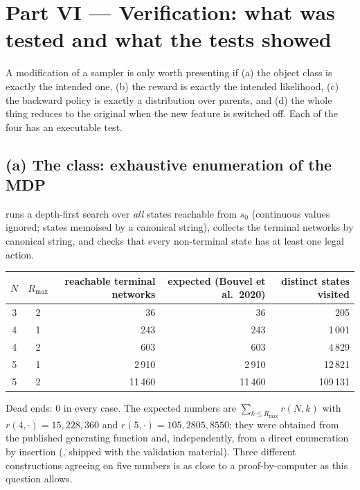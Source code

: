 \section{Part VI --- Verification: what was tested and what the tests showed}

\begin{keybox}
A modification of a sampler is only worth presenting if (a) the object class is exactly the intended one, (b) the reward is exactly the intended likelihood, (c) the backward policy is exactly a distribution over parents, and (d) the whole thing reduces to the original when the new feature is switched off. Each of the four has an executable test.
\end{keybox}

\subsection{(a) The class: exhaustive enumeration of the MDP}
 runs a depth-first search over \emph{all} states reachable from $s_0$ (continuous values ignored; states memoised by a canonical string), collects the terminal networks by canonical string, and checks that every non-terminal state has at least one legal action.
\begin{center}\small
\begin{tabular}{ccrrr}\toprule
$N$ & $R_{\max}$ & reachable terminal networks & expected (Bouvel et al.\ 2020) & distinct states visited \\ \midrule
3 & 2 & 36 & 36 & 205 \\
4 & 1 & 243 & 243 & 1\,001 \\
4 & 2 & 603 & 603 & 4\,829 \\
5 & 1 & 2\,910 & 2\,910 & 12\,821 \\
5 & 2 & 11\,460 & 11\,460 & 109\,131 \\
\bottomrule
\end{tabular}
\end{center}
Dead ends: 0 in every case. The expected numbers are $\sum_{k\le R_{\max}}r(N,k)$ with $r(4,\cdot)=15,228,360$ and $r(5,\cdot)=105,2805,8550$; they were obtained from the published generating function and, independently, from a direct enumeration by insertion (, shipped with the validation material). Three different constructions agreeing on five numbers is as close to a proof-by-computer as this question allows.

